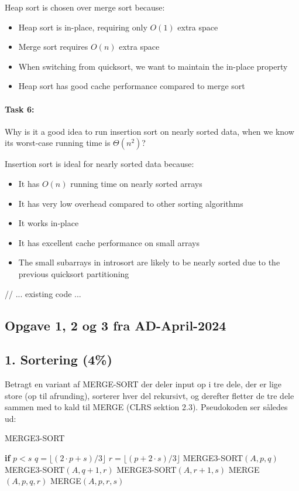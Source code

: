 \documentclass{article}
\theoremstyle{definition}
\begin{document}
Heap sort is chosen over merge sort because:
\begin{itemize}
    \item Heap sort is in-place, requiring only $O(1)$ extra space
    \item Merge sort requires $O(n)$ extra space
    \item When switching from quicksort, we want to maintain the in-place property
    \item Heap sort has good cache performance compared to merge sort
\end{itemize}

\paragraph{Task 6:} Why is it a good idea to run insertion sort on nearly sorted data, when we know its worst-case running time is $\Theta(n^2)$?

Insertion sort is ideal for nearly sorted data because:
\begin{itemize}
    \item It has $O(n)$ running time on nearly sorted arrays
    \item It has very low overhead compared to other sorting algorithms
    \item It works in-place
    \item It has excellent cache performance on small arrays
    \item The small subarrays in introsort are likely to be nearly sorted due to the previous quicksort partitioning
\end{itemize}

// ... existing code ...

\subsection{Opgave 1, 2 og 3 fra AD-April-2024}

\subsection{1. Sortering (4\%)}
Betragt en variant af MERGE-SORT der deler input op i tre dele, der er lige store (op til afrunding), sorterer hver del rekursivt, og derefter fletter de tre dele sammen med to kald til MERGE (CLRS sektion 2.3). Pseudokoden ser således ud:

\begin{algorithm}
\caption{MERGE3-SORT}
\begin{algorithmic}[1]
\State \textbf{if} $p < s$
\State \quad $q = \lfloor(2 \cdot p + s)/3\rfloor$
\State \quad $r = \lfloor(p + 2 \cdot s)/3\rfloor$
\State \quad MERGE3-SORT$(A,p,q)$
\State \quad MERGE3-SORT$(A,q+1,r)$
\State \quad MERGE3-SORT$(A,r+1,s)$
\State \quad MERGE$(A,p,q,r)$
\State \quad MERGE$(A,p,r,s)$
\end{algorithmic}
\end{algorithm}
\end{document}
